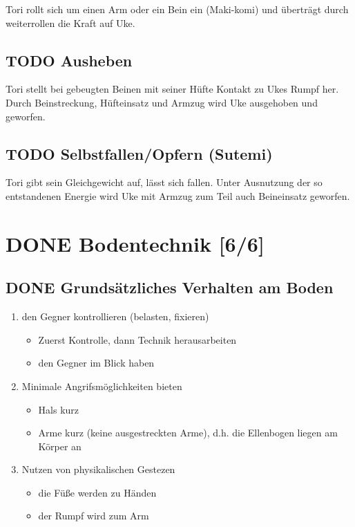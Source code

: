 \documentclass[11pt]{article}
\begin{document}
Tori rollt sich um einen Arm oder ein Bein ein (Maki-komi) und überträgt durch weiterrollen die Kraft
auf Uke.

\subsection{{\bfseries\sffamily TODO} Ausheben}
\label{sec:org220640b}

Tori stellt bei gebeugten Beinen mit seiner Hüfte Kontakt zu Ukes Rumpf her. Durch Beinstreckung,
Hüfteinsatz und Armzug wird Uke ausgehoben und geworfen.

\subsection{{\bfseries\sffamily TODO} Selbstfallen/Opfern (Sutemi)}
\label{sec:org1badea6}

Tori gibt sein Gleichgewicht auf, lässt sich fallen. Unter Ausnutzung der so entstandenen Energie
wird Uke mit Armzug zum Teil auch Beineinsatz geworfen.


\section{{\bfseries\sffamily DONE} Bodentechnik [6/6]}
\label{sec:org5b55b2b}
\subsection{{\bfseries\sffamily DONE} Grundsätzliches Verhalten am Boden}
\label{sec:org81bebe0}
\begin{enumerate}
\item den Gegner kontrollieren (belasten, fixieren) 
\begin{itemize}
\item Zuerst Kontrolle, dann Technik herausarbeiten
\item den Gegner im Blick haben
\end{itemize}
\item Minimale Angrifsmöglichkeiten bieten
\begin{itemize}
\item Hals kurz
\item Arme kurz (keine ausgestreckten Arme), d.h. die Ellenbogen liegen am Körper an
\end{itemize}
\item Nutzen von physikalischen Gestezen
\begin{itemize}
\item die Füße werden zu Händen
\item der Rumpf wird zum Arm
\end{itemize}
\end{enumerate}
\end{document}
